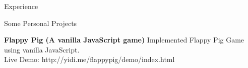 \documentclass{resume} %
\begin{document}
\begin{rSection}{Experience}




\end{rSection}

\begin{rSection}{Some Personal Projects}













\item {\bf Flappy Pig (A vanilla JavaScript game)} Implemented Flappy Pig Game using vanilla JavaScript.\\ Live Demo: http://yidi.me/flappypig/demo/index.html

\end{rSection}
\end{document}
